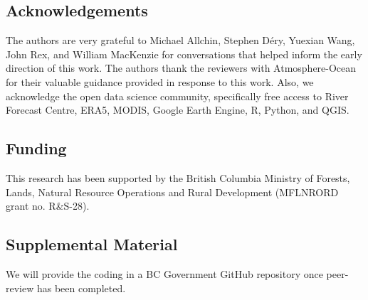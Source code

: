 \documentclass{tATO2e}
\begin{document}
\subsection{Acknowledgements}

The authors are very grateful to Michael Allchin, Stephen Déry, Yuexian Wang, John Rex, and William MacKenzie for conversations that helped inform the early direction of this work. The authors thank the reviewers with Atmosphere-Ocean for their valuable guidance provided in response to this work. Also, we acknowledge the open data science community, specifically free access to River Forecast Centre, ERA5, MODIS, Google Earth Engine, R, Python, and QGIS. 

\subsection{Funding}

This research has been supported by the British Columbia Ministry of Forests, Lands, Natural Resource Operations and Rural Development (MFLNRORD grant no. R\&S-28).

\subsection{Supplemental Material}

We will provide the coding in a BC Government GitHub repository once peer-review has been completed. 



\end{document}
